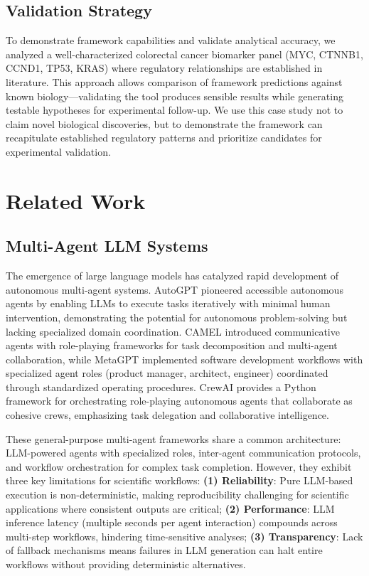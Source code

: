 \documentclass[11pt]{article}
\begin{document}
\subsection{Validation Strategy}

To demonstrate framework capabilities and validate analytical accuracy, we analyzed a well-characterized colorectal cancer biomarker panel (MYC, CTNNB1, CCND1, TP53, KRAS) where regulatory relationships are established in literature. This approach allows comparison of framework predictions against known biology---validating the tool produces sensible results while generating testable hypotheses for experimental follow-up. We use this case study not to claim novel biological discoveries, but to demonstrate the framework can recapitulate established regulatory patterns and prioritize candidates for experimental validation.

\section{Related Work}

\subsection{Multi-Agent LLM Systems}

The emergence of large language models has catalyzed rapid development of autonomous multi-agent systems. AutoGPT \cite{autogpt} pioneered accessible autonomous agents by enabling LLMs to execute tasks iteratively with minimal human intervention, demonstrating the potential for autonomous problem-solving but lacking specialized domain coordination. CAMEL \cite{camel2023} introduced communicative agents with role-playing frameworks for task decomposition and multi-agent collaboration, while MetaGPT \cite{metagpt2023} implemented software development workflows with specialized agent roles (product manager, architect, engineer) coordinated through standardized operating procedures. CrewAI \cite{crewai} provides a Python framework for orchestrating role-playing autonomous agents that collaborate as cohesive crews, emphasizing task delegation and collaborative intelligence.

These general-purpose multi-agent frameworks share a common architecture: LLM-powered agents with specialized roles, inter-agent communication protocols, and workflow orchestration for complex task completion. However, they exhibit three key limitations for scientific workflows: \textbf{(1) Reliability}: Pure LLM-based execution is non-deterministic, making reproducibility challenging for scientific applications where consistent outputs are critical; \textbf{(2) Performance}: LLM inference latency (multiple seconds per agent interaction) compounds across multi-step workflows, hindering time-sensitive analyses; \textbf{(3) Transparency}: Lack of fallback mechanisms means failures in LLM generation can halt entire workflows without providing deterministic alternatives.
\end{document}

